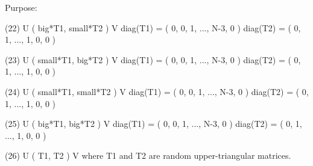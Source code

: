 \begin{DoxyParagraph}{Purpose\+: }
\begin{DoxyVerb}
 (22) U ( big*T1, small*T2 ) V    diag(T1) = ( 0, 0, 1, ..., N-3, 0 )
                                  diag(T2) = ( 0, 1, ..., 1, 0, 0 )

 (23) U ( small*T1, big*T2 ) V    diag(T1) = ( 0, 0, 1, ..., N-3, 0 )
                                  diag(T2) = ( 0, 1, ..., 1, 0, 0 )

 (24) U ( small*T1, small*T2 ) V  diag(T1) = ( 0, 0, 1, ..., N-3, 0 )
                                  diag(T2) = ( 0, 1, ..., 1, 0, 0 )

 (25) U ( big*T1, big*T2 ) V      diag(T1) = ( 0, 0, 1, ..., N-3, 0 )
                                  diag(T2) = ( 0, 1, ..., 1, 0, 0 )

 (26) U ( T1, T2 ) V     where T1 and T2 are random upper-triangular
                         matrices.\end{DoxyVerb}
 
\end{DoxyParagraph}

